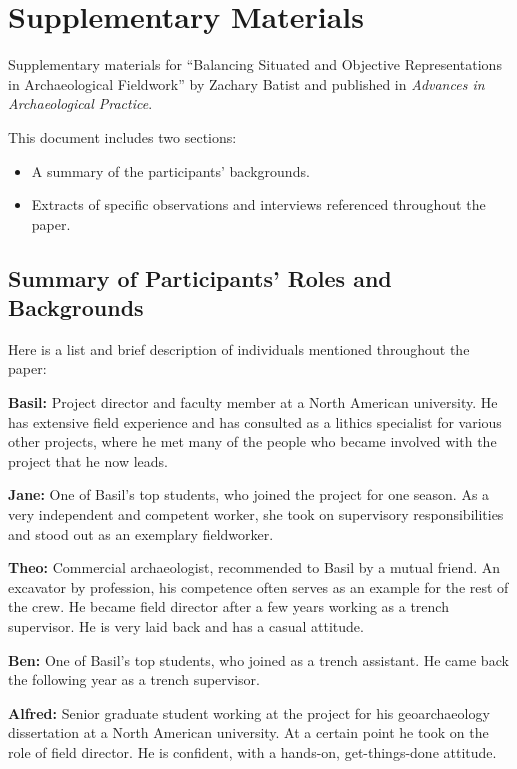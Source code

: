 \documentclass[
]{article}
\author{}
\date{}
\providecommand{\tightlist}{%
  \setlength{\itemsep}{0pt}\setlength{\parskip}{0pt}}
\begin{document}
\section{Supplementary Materials}\label{supplementary-materials}

Supplementary materials for ``Balancing Situated and Objective
Representations in Archaeological Fieldwork'' by Zachary Batist and
published in \emph{Advances in Archaeological Practice}.

This document includes two sections:

\begin{itemize}
\tightlist
\item
  A summary of the participants' backgrounds.
\item
  Extracts of specific observations and interviews referenced throughout
  the paper.
\end{itemize}

\subsection{Summary of Participants' Roles and
Backgrounds}\label{summary-of-participants-roles-and-backgrounds}

Here is a list and brief description of individuals mentioned throughout
the paper:

\textbf{Basil:} Project director and faculty member at a North American
university. He has extensive field experience and has consulted as a
lithics specialist for various other projects, where he met many of the
people who became involved with the project that he now leads.

\textbf{Jane:} One of Basil's top students, who joined the project for
one season. As a very independent and competent worker, she took on
supervisory responsibilities and stood out as an exemplary fieldworker.

\textbf{Theo:} Commercial archaeologist, recommended to Basil by a
mutual friend. An excavator by profession, his competence often serves
as an example for the rest of the crew. He became field director after a
few years working as a trench supervisor. He is very laid back and has a
casual attitude.

\textbf{Ben:} One of Basil's top students, who joined as a trench
assistant. He came back the following year as a trench supervisor.

\textbf{Alfred:} Senior graduate student working at the project for his
geoarchaeology dissertation at a North American university. At a certain
point he took on the role of field director. He is confident, with a
hands-on, get-things-done attitude.
\end{document}
